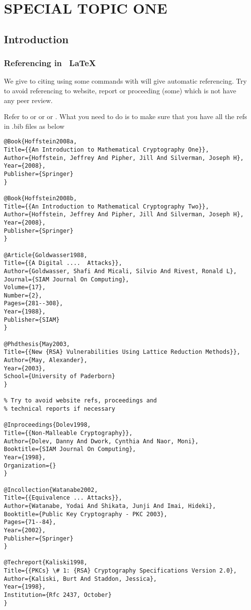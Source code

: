 \chapter{\textbf{SPECIAL TOPIC ONE }}\label{anotherlook}

\section{Introduction}
\lipsum[1-2]

\subsection{Referencing in \, \LaTeX}

We give to citing using some commands with will give automatic referencing. Try to avoid referencing to website, report or proceeding (some) which is not have any peer review.

Refer to \cite{Hoffstein2008a}  or \cite{Hoffstein2008b} or \cite{Goldwasser1988} or \cite{May2003}. What you need to do is to make sure that you have all the refs in .bib files as below

\begin{verbatim}
@Book{Hoffstein2008a,
Title={{An Introduction to Mathematical Cryptography One}},
Author={Hoffstein, Jeffrey And Pipher, Jill And Silverman, Joseph H},
Year={2008},
Publisher={Springer}
}

@Book{Hoffstein2008b,
Title={{An Introduction to Mathematical Cryptography Two}},
Author={Hoffstein, Jeffrey And Pipher, Jill And Silverman, Joseph H},
Year={2008},
Publisher={Springer}
}

@Article{Goldwasser1988,
Title={{A Digital ....  Attacks}},
Author={Goldwasser, Shafi And Micali, Silvio And Rivest, Ronald L},
Journal={SIAM Journal On Computing},
Volume={17},
Number={2},
Pages={281--308},
Year={1988},
Publisher={SIAM}
}

@Phdthesis{May2003,
Title={{New {RSA} Vulnerabilities Using Lattice Reduction Methods}},
Author={May, Alexander},
Year={2003},
School={University of Paderborn}
}

% Try to avoid website refs, proceedings and 
% technical reports if necessary

@Inproceedings{Dolev1998,
Title={{Non-Malleable Cryptography}},
Author={Dolev, Danny And Dwork, Cynthia And Naor, Moni},
Booktitle={SIAM Journal On Computing},
Year={1998},
Organization={}
}

@Incollection{Watanabe2002,
Title={{Equivalence ... Attacks}},
Author={Watanabe, Yodai And Shikata, Junji And Imai, Hideki},
Booktitle={Public Key Cryptography - PKC 2003},
Pages={71--84},
Year={2002},
Publisher={Springer}
}

@Techreport{Kaliski1998,
Title={{PKCs} \# 1: {RSA} Cryptography Specifications Version 2.0},
Author={Kaliski, Burt And Staddon, Jessica},
Year={1998},
Institution={Rfc 2437, October}
}
\end{verbatim}

